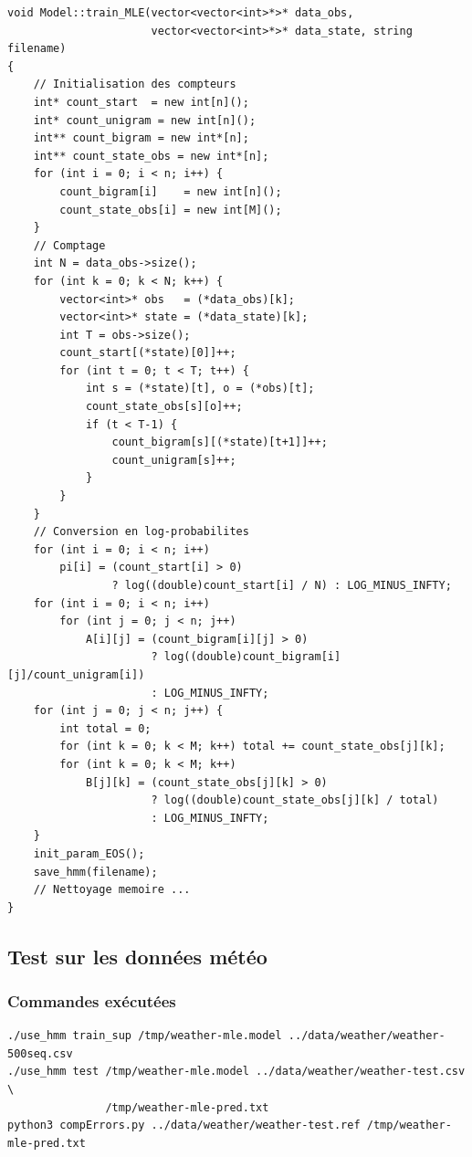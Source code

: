 \documentclass[12pt,a4paper]{article}
\begin{document}
\begin{lstlisting}[style=cppstyle, caption={Apprentissage MLE supervisé --- \texttt{model.cpp}}]
void Model::train_MLE(vector<vector<int>*>* data_obs,
                      vector<vector<int>*>* data_state, string filename)
{
    // Initialisation des compteurs
    int* count_start  = new int[n]();
    int* count_unigram = new int[n]();
    int** count_bigram = new int*[n];
    int** count_state_obs = new int*[n];
    for (int i = 0; i < n; i++) {
        count_bigram[i]    = new int[n]();
        count_state_obs[i] = new int[M]();
    }
    // Comptage
    int N = data_obs->size();
    for (int k = 0; k < N; k++) {
        vector<int>* obs   = (*data_obs)[k];
        vector<int>* state = (*data_state)[k];
        int T = obs->size();
        count_start[(*state)[0]]++;
        for (int t = 0; t < T; t++) {
            int s = (*state)[t], o = (*obs)[t];
            count_state_obs[s][o]++;
            if (t < T-1) {
                count_bigram[s][(*state)[t+1]]++;
                count_unigram[s]++;
            }
        }
    }
    // Conversion en log-probabilites
    for (int i = 0; i < n; i++)
        pi[i] = (count_start[i] > 0)
                ? log((double)count_start[i] / N) : LOG_MINUS_INFTY;
    for (int i = 0; i < n; i++)
        for (int j = 0; j < n; j++)
            A[i][j] = (count_bigram[i][j] > 0)
                      ? log((double)count_bigram[i][j]/count_unigram[i])
                      : LOG_MINUS_INFTY;
    for (int j = 0; j < n; j++) {
        int total = 0;
        for (int k = 0; k < M; k++) total += count_state_obs[j][k];
        for (int k = 0; k < M; k++)
            B[j][k] = (count_state_obs[j][k] > 0)
                      ? log((double)count_state_obs[j][k] / total)
                      : LOG_MINUS_INFTY;
    }
    init_param_EOS();
    save_hmm(filename);
    // Nettoyage memoire ...
}
\end{lstlisting}

\subsection{Test sur les données météo}

\subsubsection*{Commandes exécutées}

\begin{lstlisting}[style=bashstyle]
./use_hmm train_sup /tmp/weather-mle.model ../data/weather/weather-500seq.csv
./use_hmm test /tmp/weather-mle.model ../data/weather/weather-test.csv \
               /tmp/weather-mle-pred.txt
python3 compErrors.py ../data/weather/weather-test.ref /tmp/weather-mle-pred.txt
\end{lstlisting}
\end{document}
